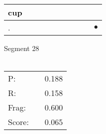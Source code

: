 \documentclass[landscape]{article}
\newcommand{\ssp}{\hspace{2pt}}
\newcommand{\mex}{\cellcolor{g}$\bullet$}
\begin{document}
\begin{tabular}{|l|p{10pt}|p{10pt}|p{10pt}|p{10pt}|p{10pt}|p{10pt}|p{10pt}|p{10pt}|p{10pt}|}
\hline
\ssp cup \ssp&\hspace{2pt}&\hspace{2pt}&\hspace{2pt}&\hspace{2pt}&\hspace{2pt}&\hspace{2pt}&\hspace{2pt}&\hspace{2pt}&\hspace{2pt}\\
\hline
\ssp \cellcolor{ref8}. \ssp&\hspace{2pt}&\hspace{2pt}&\hspace{2pt}&\hspace{2pt}&\hspace{2pt}&\hspace{2pt}&\hspace{2pt}&\hspace{2pt}&\hspace{2pt}\mex\\
\hline
\end{tabular}

\vspace{6pt}
\noindent Segment 28\\\\
\noindent\begin{tabular}{lm{12pt}r}
\hline
P:&&0.188\\
R:&&0.158\\
Frag:&&0.600\\
Score:&&0.065\\
\end{tabular}

\newpage
\end{document}
